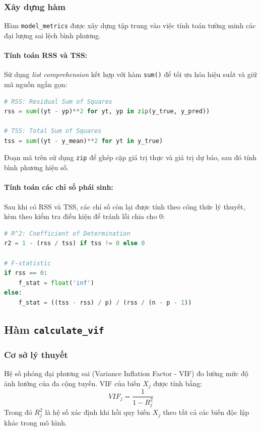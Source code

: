 \subsubsection{Xây dựng hàm}
Hàm \texttt{model\_metrics} được xây dựng tập trung vào việc tính toán tường minh các đại lượng sai lệch bình phương.

\paragraph{Tính toán RSS và TSS:}
Sử dụng \textit{list comprehension} kết hợp với hàm \texttt{sum()} để tối ưu hóa hiệu suất và giữ mã nguồn ngắn gọn:
\begin{lstlisting}[language=Python, caption=Tính toán RSS và TSS]
# RSS: Residual Sum of Squares
rss = sum((yt - yp)**2 for yt, yp in zip(y_true, y_pred))

# TSS: Total Sum of Squares
tss = sum((yt - y_mean)**2 for yt in y_true)
\end{lstlisting}
Đoạn mã trên sử dụng \texttt{zip} để ghép cặp giá trị thực và giá trị dự báo, sau đó tính bình phương hiệu số.

\paragraph{Tính toán các chỉ số phái sinh:}
Sau khi có RSS và TSS, các chỉ số còn lại được tính theo công thức lý thuyết, kèm theo kiểm tra điều kiện để tránh lỗi chia cho 0:
\begin{lstlisting}[language=Python, caption=Tính toán R2 và F-statistic]
# R^2: Coefficient of Determination
r2 = 1 - (rss / tss) if tss != 0 else 0

# F-statistic
if rss == 0:
    f_stat = float('inf')
else:
    f_stat = ((tss - rss) / p) / (rss / (n - p - 1))
\end{lstlisting}

\subsection{Hàm \texttt{calculate\_vif}}

\subsubsection{Cơ sở lý thuyết}
Hệ số phóng đại phương sai (Variance Inflation Factor - VIF) đo lường mức độ ảnh hưởng của đa cộng tuyến. VIF của biến $X_j$ được tính bằng:
\begin{equation}
    VIF_j = \frac{1}{1 - R_j^2}
\end{equation}
Trong đó $R_j^2$ là hệ số xác định khi hồi quy biến $X_j$ theo tất cả các biến độc lập khác trong mô hình.

